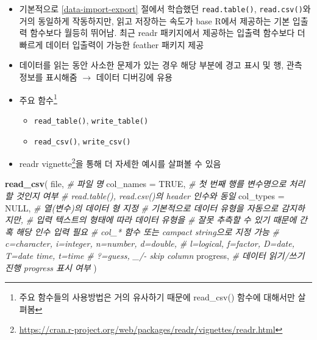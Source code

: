 \documentclass[
  11pt,
]{krantz}
\newenvironment{Shaded}{\begin{snugshade}}{\end{snugshade}}
\newcommand{\CommentTok}[1]{\textcolor[rgb]{0.37,0.37,0.37}{\textit{#1}}}
\newcommand{\DataTypeTok}[1]{\textcolor[rgb]{0.27,0.27,0.27}{#1}}
\newcommand{\KeywordTok}[1]{\textcolor[rgb]{0.27,0.27,0.27}{\textbf{#1}}}
\newcommand{\NormalTok}[1]{#1}
\newcommand{\OtherTok}[1]{\textcolor[rgb]{0.37,0.37,0.37}{#1}}
\providecommand{\tightlist}{%
  \setlength{\itemsep}{0pt}\setlength{\parskip}{0pt}}
\renewcommand{\href}[2]{#2\footnote{\url{#1}}}
\begin{document}
\begin{itemize}
\item
  기본적으로 \ref{data-import-export} 절에서 학습했던 \texttt{read.table()}, \texttt{read.csv()}와 거의 동일하게 작동하지만, 읽고 저장하는 속도가 base R에서 제공하는 기본 입출력 함수보다 월등히 뛰어남. 최근 readr 패키지에서 제공하는 입출력 함수보다 더 빠르게 데이터 입출력이 가능한 feather 패키지 \citep{R-feather} 제공
\item
  데이터를 읽는 동안 사소한 문제가 있는 경우 해당 부분에 경고 표시 및 행, 관측 정보를 표시해줌 \(\rightarrow\) 데이터 디버깅에 유용
\item
  주요 함수\footnote{주요 함수들의 사용방법은 거의 유사하기 때문에 read\_csv() 함수에 대해서만 살펴봄}

  \begin{itemize}
  \tightlist
  \item
    \texttt{read\_table()}, \texttt{write\_table()}
  \item
    \texttt{read\_csv()}, \texttt{write\_csv()}
  \end{itemize}
\item
  \href{https://cran.r-project.org/web/packages/readr/vignettes/readr.html}{readr vignette}을 통해 더 자세한 예시를 살펴볼 수 있음
\end{itemize}

\footnotesize

\begin{Shaded}
\begin{Highlighting}[]
\KeywordTok{read_csv}\NormalTok{(}
\NormalTok{  file, }\CommentTok{# 파일 명}
  \DataTypeTok{col_names =} \OtherTok{TRUE}\NormalTok{, }\CommentTok{# 첫 번째 행를 변수명으로 처리할 것인지 여부}
                    \CommentTok{# read.table(), read.csv()의 header 인수와 동일}
  \DataTypeTok{col_types =} \OtherTok{NULL}\NormalTok{, }\CommentTok{# 열(변수)의 데이터 형 지정}
                    \CommentTok{# 기본적으로 데이터 유형을 자동으로 감지하지만, }
                    \CommentTok{# 입력 텍스트의 형태에 따라 데이터 유형을 }
                    \CommentTok{# 잘못 추측할 수 있기 때문에 간혹 해당 인수 입력 필요}
                    \CommentTok{# col_* 함수 또는 campact string으로 지정 가능}
                    \CommentTok{# c=character, i=integer, n=number, d=double, }
                    \CommentTok{# l=logical, f=factor, D=date, T=date time, t=time}
                    \CommentTok{# ?=guess, _/- skip column}
\NormalTok{  progress, }\CommentTok{# 데이터 읽기/쓰기  진행 progress 표시 여부}
\NormalTok{)}
\end{Highlighting}
\end{Shaded}
\end{document}

